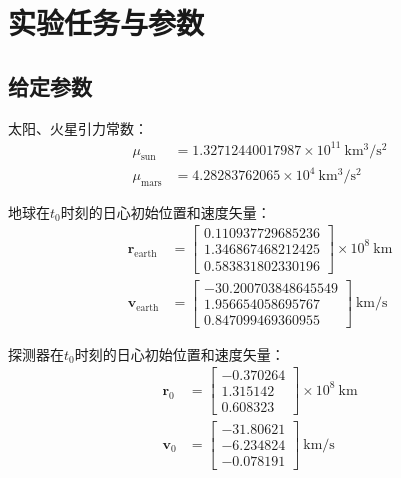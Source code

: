 \documentclass[12pt,a4paper]{article}
\begin{document}
\section{实验任务与参数}
\subsection{给定参数}
太阳、火星引力常数：
\begin{equation*}
    \begin{aligned}
        \mu_{\text{sun}} &= 1.32712440017987 \times 10^{11}\ \mathrm{km^3/s^2} \\
        \mu_{\text{mars}} &= 4.28283762065 \times 10^{4}\ \mathrm{km^3/s^2}
    \end{aligned}
\end{equation*}

地球在$t_0$时刻的日心初始位置和速度矢量：
\begin{equation*}
    \begin{aligned}
        \mathbf{r}_{\text{earth}} &=
        \begin{bmatrix}
             0.110937729685236 \\
             1.346867468212425 \\
             0.583831802330196
        \end{bmatrix}
        \times 10^8
        \ \mathrm{km} \\
        \mathbf{v}_{\text{earth}} &= 
        \begin{bmatrix}
            -30.200703848645549 \\
            1.956654058695767\\
            0.847099469360955
        \end{bmatrix}\ \mathrm{km/s}
    \end{aligned}
\end{equation*}

探测器在$t_0$时刻的日心初始位置和速度矢量：
\begin{equation*}
    \begin{aligned}
        \mathbf{r}_0 &=
        \begin{bmatrix}
            -0.370264 \\ 
            1.315142 \\ 
            0.608323
        \end{bmatrix}
        \times 10^8
        \ \mathrm{km} \\
        \mathbf{v}_0 &= 
        \begin{bmatrix}
            -31.80621 \\ 
            -6.234824 \\ 
            -0.078191
        \end{bmatrix}\ \mathrm{km/s}
    \end{aligned}
\end{equation*}
\end{document}
